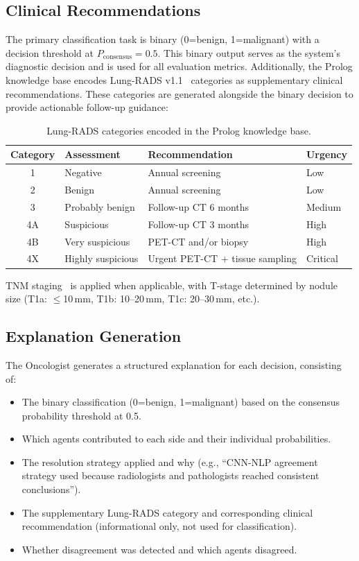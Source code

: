 \documentclass[12pt]{article}
\begin{document}
\subsection{Clinical Recommendations}
\label{subsec:recommendations}

The primary classification task is binary (0=benign, 1=malignant) with a decision threshold at $P_\text{consensus} = 0.5$. This binary output serves as the system's diagnostic decision and is used for all evaluation metrics. Additionally, the Prolog knowledge base encodes Lung-RADS v1.1~\cite{acr2019lungrads} categories as supplementary clinical recommendations. These categories are generated alongside the binary decision to provide actionable follow-up guidance:

\begin{table}[ht]
\centering
\begin{tabular}{clll}
\toprule
\textbf{Category} & \textbf{Assessment} & \textbf{Recommendation} & \textbf{Urgency} \\
\midrule
1  & Negative     & Annual screening & Low \\
2  & Benign       & Annual screening & Low \\
3  & Probably benign & Follow-up CT 6 months & Medium \\
4A & Suspicious   & Follow-up CT 3 months & High \\
4B & Very suspicious & PET-CT and/or biopsy & High \\
4X & Highly suspicious & Urgent PET-CT + tissue sampling & Critical \\
\bottomrule
\end{tabular}
\caption{Lung-RADS categories encoded in the Prolog knowledge base.}
\label{tab:lung-rads}
\end{table}

TNM staging~\cite{ajcc2017stagingmanual8} is applied when applicable, with T-stage determined by nodule size (T1a: $\leq$10\,mm, T1b: 10--20\,mm, T1c: 20--30\,mm, etc.).

\subsection{Explanation Generation}
\label{subsec:explanation}

The Oncologist generates a structured explanation for each decision, consisting of:
\begin{itemize}
    \item The binary classification (0=benign, 1=malignant) based on the consensus probability threshold at 0.5.
    \item Which agents contributed to each side and their individual probabilities.
    \item The resolution strategy applied and why (e.g., ``CNN-NLP agreement strategy used because radiologists and pathologists reached consistent conclusions'').
    \item The supplementary Lung-RADS category and corresponding clinical recommendation (informational only, not used for classification).
    \item Whether disagreement was detected and which agents disagreed.
\end{itemize}
\end{document}
